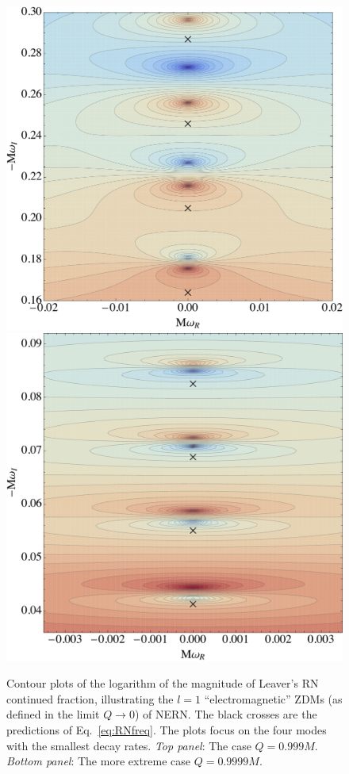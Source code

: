 \begin{refsection}
\begin{figure}[tb]
\includegraphics[width =.95 \columnwidth]{chapter_extremal/etc/RNlow.pdf}
\includegraphics[width =.95 \columnwidth]{chapter_extremal/etc/RNhigh.pdf}
\caption{Contour plots of the logarithm of the magnitude of Leaver's RN continued fraction, illustrating the $l=1$ ``electromagnetic'' ZDMs (as defined in the limit $Q \to 0$) of NERN. The black crosses are the predictions of Eq.~\eqref{eq:RNfreq}. The plots focus on the four modes with the smallest decay rates. {\it Top panel}: The case $Q=0.999M$.  {\it Bottom panel}: The more extreme case $Q=0.9999M$. }
\label{fig:RNClose}
\end{figure}



\end{refsection}
